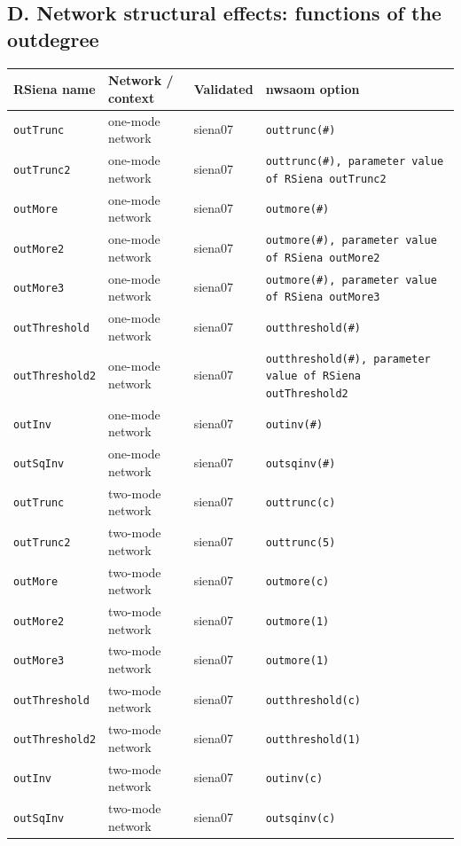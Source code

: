 \subsection*{D. Network structural effects: functions of the outdegree}
\footnotesize
\begin{longtable}{@{}p{2.6cm}p{3.2cm}p{2.9cm}p{5.4cm}@{}}
\toprule
RSiena name & Network / context & Validated & nwsaom option\\
\midrule
\endhead
\texttt{outTrunc} & one-mode network & siena07 & \texttt{outtrunc(\#)}\\
\texttt{outTrunc2} & one-mode network & siena07 & \texttt{outtrunc(\#), parameter value of RSiena outTrunc2}\\
\texttt{outMore} & one-mode network & siena07 & \texttt{outmore(\#)}\\
\texttt{outMore2} & one-mode network & siena07 & \texttt{outmore(\#), parameter value of RSiena outMore2}\\
\texttt{outMore3} & one-mode network & siena07 & \texttt{outmore(\#), parameter value of RSiena outMore3}\\
\texttt{outThreshold} & one-mode network & siena07 & \texttt{outthreshold(\#)}\\
\texttt{outThreshold2} & one-mode network & siena07 & \texttt{outthreshold(\#), parameter value of RSiena outThreshold2}\\
\texttt{outInv} & one-mode network & siena07 & \texttt{outinv(\#)}\\
\texttt{outSqInv} & one-mode network & siena07 & \texttt{outsqinv(\#)}\\
\texttt{outTrunc} & two-mode network & siena07 & \texttt{outtrunc(c)}\\
\texttt{outTrunc2} & two-mode network & siena07 & \texttt{outtrunc(5)}\\
\texttt{outMore} & two-mode network & siena07 & \texttt{outmore(c)}\\
\texttt{outMore2} & two-mode network & siena07 & \texttt{outmore(1)}\\
\texttt{outMore3} & two-mode network & siena07 & \texttt{outmore(1)}\\
\texttt{outThreshold} & two-mode network & siena07 & \texttt{outthreshold(c)}\\
\texttt{outThreshold2} & two-mode network & siena07 & \texttt{outthreshold(1)}\\
\texttt{outInv} & two-mode network & siena07 & \texttt{outinv(c)}\\
\texttt{outSqInv} & two-mode network & siena07 & \texttt{outsqinv(c)}\\

\end{longtable}
